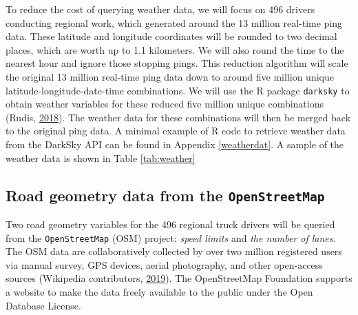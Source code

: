 \documentclass[12pt]{book}
\numberwithin{equation}{chapter}
\begin{document}
To reduce the cost of querying weather data, we will focus on 496 drivers conducting regional work, which generated around the 13 million real-time ping data. These latitude and longitude coordinates will be rounded to two decimal places, which are worth up to 1.1 kilometers. We will also round the time to the nearest hour and ignore those stopping pings. This reduction algorithm will scale the original 13 million real-time ping data down to around five million unique latitude-longitude-date-time combinations. We will use the R package \texttt{darksky} to obtain weather variables for these reduced five million unique combinations (Rudis, \protect\hyperlink{ref-hrbrmstr}{2018}). The weather data for these combinations will then be merged back to the original ping data. A minimal example of R code to retrieve weather data from the DarkSky API can be found in Appendix \ref{weatherdat}. A sample of the weather data is shown in Table \ref{tab:weather}

\begin{table}[!h]

\caption{\label{tab:weather}weather from the DarkSky API}
\centering
{}
\end{table}

\hypertarget{road-geometry-data-from-the-openstreetmap}{%
\subsection{\texorpdfstring{Road geometry data from the \texttt{OpenStreetMap}}{Road geometry data from the OpenStreetMap}}\label{road-geometry-data-from-the-openstreetmap}}

Two road geometry variables for the 496 regional truck drivers will be queried from the \texttt{OpenStreetMap} (OSM) project: \emph{speed limits} and \emph{the number of lanes}. The OSM data are collaboratively collected by over two million registered users via manual survey, GPS devices, aerial photography, and other open-access sources (Wikipedia contributors, \protect\hyperlink{ref-wikiOSM}{2019}). The OpenStreetMap Foundation supports a website to make the data freely available to the public under the Open Database License.
\end{document}
